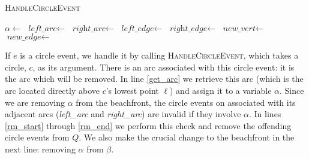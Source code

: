 \documentclass[12pt,twoside]{reedthesis}
\begin{document}
    \begin{algorithm}[!htb]
    \caption{\textsc{HandleCircleEvent}}\label{HandleCircleEvent}
    \begin{algorithmic}[1]
    \State $\alpha\gets$\label{get_arc}
    \State $\textit{left\_arc}\gets$
    \State $\textit{right\_arc}\gets$
    \State $\textit{left\_edge}\gets$ 
    \State $\textit{right\_edge}\gets$ 
    \label{rm_start}
      \State {}
    \EndIf
      \State {}
    \EndIf  \label{rm_end}
    \State {}
    \State $\textit{new\_vert}\gets$ \label{new_vert} 
    \State $\textit{new\_edge}\gets$ \label{new_edge}
    \State {} \label{set_src}
    \State {}\label{update_left} 
    \State {}\label{update_right}
    \State {}
    \State {} 
    \EndProcedure
    \end{algorithmic} 
    \end{algorithm}

    If $e$ is a circle event, we handle it by calling \textsc{HandleCircleEvent}, which takes a circle, $c$, as its argument. There is an arc associated with this circle event: it is the arc which will be removed. In line \ref{get_arc} we retrieve this arc (which is the arc located directly above $c$'s lowest point $\ell$) and assign it to a variable $\alpha$. Since we are removing $\alpha$ from the beachfront, the circle events on associated with its adjacent arcs (\textit{left\_arc} and \textit{right\_arc}) are invalid if they involve $\alpha$. In lines \ref{rm_start} through \ref{rm_end} we perform this check and remove the offending circle events from $Q$. We also make the crucial change to the beachfront in the next line: removing $\alpha$ from $\beta$.\par
\end{document}
